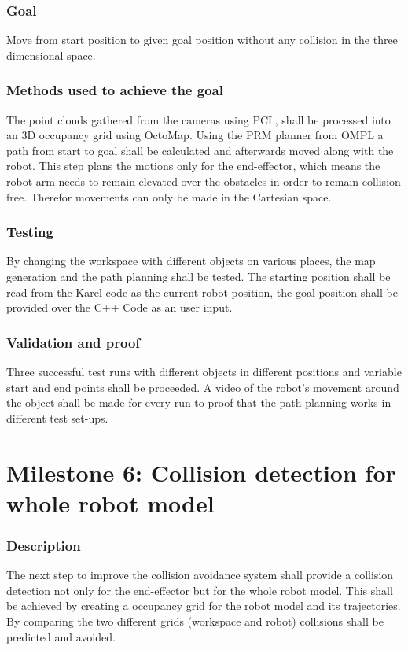 \subsubsection{Goal}
Move from start position to given goal position without any collision in the three dimensional space.
\subsubsection{Methods used to achieve the goal}
The point clouds gathered from the cameras using PCL, shall be processed into an 3D occupancy grid using OctoMap. Using the PRM planner from OMPL a path from start to goal shall be calculated and afterwards moved along with the robot.
This step plans the motions only for the end-effector, which means the robot arm needs to remain elevated over the obstacles in order to remain collision free. Therefor movements can only be made in the Cartesian space.
\subsubsection{Testing}
By changing the workspace with different objects on various places, the map generation and the path planning shall be tested. The starting position shall be read from the Karel code as the current robot position, the goal position shall be provided over the C++ Code as an user input.
\subsubsection{Validation and proof}
Three successful test runs with different objects in different positions and variable start and end points shall be proceeded.
A video of the robot's movement around the object shall be made for every run to proof that the path planning works in different test set-ups.

\section{Milestone 6: Collision detection for whole robot model}
\label{chap:mile6}
\subsubsection{Description}
The next step to improve the collision avoidance system shall provide a collision detection not only for the end-effector but for the whole robot model. This shall be achieved by creating a occupancy grid for the robot model and its trajectories. By comparing the two different grids (workspace and robot) collisions shall be predicted and avoided.
